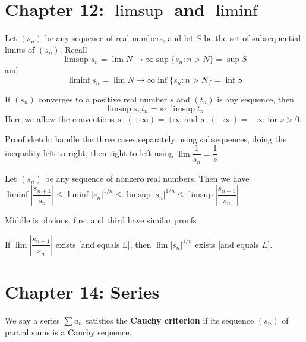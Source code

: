 \documentclass[10pt]{article}
\begin{document}
\section*{Chapter 12: $\limsup$ and $\liminf$}
\begin{defn}
Let $(s_n)$ be any sequence of real numbers, and let $S$ be the set of subsequential limits of $(s_n)$. Recall \begin{equation*}
    \limsup{s_n} = \lim\limits{N \to \infty} \sup \{s_n: n > N\} = \sup S
\end{equation*}
and 
\begin{equation*}
    \liminf{s_n} = \lim\limits{N \to \infty} \inf\{s_n : n > N\} = \inf S
\end{equation*}
\end{defn}

\begin{thm}
If $(s_n)$ converges to a positive real number $s$ and $(t_n)$ is any sequence, then \begin{equation*}
    \limsup s_nt_n = s\cdot \limsup t_n
\end{equation*}
Here we allow the conventions $s \cdot (+\infty) = +\infty$ and $s\cdot(-\infty) = -\infty$ for $s > 0$.
\end{thm}
Proof sketch: handle the three cases separately using subsequences, doing the inequality left to right, then right to left using $\lim\dfrac{1}{s_n} = \dfrac{1}{s}$

\begin{thm}
Let $(s_n)$ be any sequence of nonzero real numbers. Then we have $\liminf\left|\dfrac{s_{n+1}}{s_n}\right| \leq \liminf |s_n|^{1/n}\leq \limsup |s_n|^{1/n} \leq \limsup\left|\dfrac{s_{n+1}}{s_n}\right|$
\end{thm}
Middle is obvious, first and third have similar proofs

\begin{cor}
If $\lim\left|\dfrac{s_{n+1}}{s_n}\right|$ exists [and equals L], then $\lim\left|s_n\right|^{1/n}$ exists [and equals $L$].
\end{cor}

\section*{Chapter 14: Series}
\begin{defn}
We say a series $\sum a_n$ satisfies the \textbf{Cauchy criterion} if its sequence $(s_n)$ of partial sums is a Cauchy sequence.
\end{defn}
\end{document}
